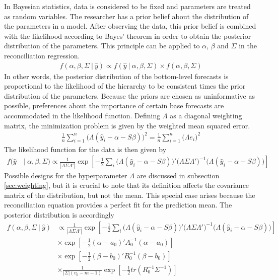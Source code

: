 \documentclass[a4paper,fleqn,11pt]{article}
\begin{document}
In Bayesian statistics, data is considered to be fixed and parameters are treated as random variables. The researcher has a prior belief about the distribution of the parameters in a model. After observing the data, this prior belief is combined with the likelihood according to Bayes' theorem in order to obtain the posterior distribution of the parameters. This principle can be applied to $\alpha$, $\beta$ and $\Sigma$ in the reconciliation regression.
\begin{align}
	f(\alpha, \beta, \Sigma\ |\ \hat{y}) \propto f(\hat{y}\ |\ \alpha, \beta, \Sigma) \times f(\alpha, \beta, \Sigma)
\end{align}
In other words, the posterior distribution of the bottom-level forecasts is proportional to the likelihood of the hierarchy to be consistent times the prior distribution of the parameters. Because the priors are chosen as uninformative as possible, preferences about the importance of certain base forecasts are accommodated in the likelihood function. Defining $\Lambda$ as a diagonal weighting matrix, the minimization problem is given by the weighted mean squared error.
\begin{align}
\frac{1}{n}\sum_{i=1}^n \Big( \Lambda(\hat{y}_i - \alpha - S\beta)\Big)^2 = \frac{1}{n}\sum_{i=1}^n \Big( \Lambda e_i\Big)^2
\end{align}
The likelihood function for the data is then given by 
\begin{align*}
f(\hat{y}\ &|\ \alpha,\beta,\Sigma) \propto \frac{1}{|\Lambda\Sigma\Lambda'|} \exp\left[-\frac{1}{2} \sum_i \big( \Lambda(\hat{y}_i - \alpha - S\beta)\big)'\big(\Lambda\Sigma\Lambda'\big)^{-1}\big(\Lambda(\hat{y}_i - \alpha - S\beta)\big)\right]
\end{align*}
Possible designs for the hyperparameter $\Lambda$ are discussed in subsection \ref{sec:weighting}, but it is crucial to note that its definition affects the covariance matrix of the distribution, but not the mean. This special case arises because the reconciliation equation provides a perfect fit for the prediction mean. The posterior distribution is accordingly
\begin{align*}
f(\alpha,\beta,\Sigma\ |\ \hat{y}) & \propto \frac{1}{|\Lambda\Sigma\Lambda'|} \exp\left[-\frac{1}{2} \sum_i \big( \Lambda(\hat{y}_i - \alpha - S\beta)\big)'\big(\Lambda\Sigma\Lambda'\big)^{-1}\big(\Lambda(\hat{y}_i - \alpha - S\beta)\big)\right] \\
&\times \exp \left[-\frac{1}{2}(\alpha - a_0)'A_0^{-1}(\alpha - a_0)\right] \\
&\times \exp \left[-\frac{1}{2}(\beta - b_0)'B_0^{-1}(\beta - b_0)\right] \\
&\times \frac{1}{|\Sigma|(v_0 - m - 1)} \exp \left[-\frac{1}{2} tr(R_0^{-1}\Sigma^{-1}) \right]
\end{align*}
\end{document}
